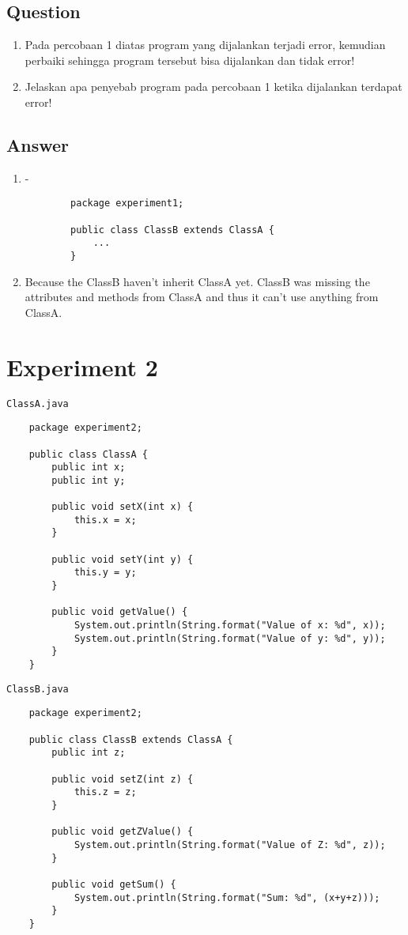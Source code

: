 \documentclass[12pt,titlepage]{article}
\begin{document}
\subsection{Question}
\begin{enumerate}
    \item Pada percobaan 1 diatas program yang dijalankan terjadi error, kemudian perbaiki sehingga program tersebut bisa dijalankan dan tidak error!
    \item Jelaskan apa penyebab program pada percobaan 1 ketika dijalankan terdapat error!
\end{enumerate}

\subsection{Answer}
\begin{enumerate}
    \item -
    \begin{verbatim}
        package experiment1;
    
        public class ClassB extends ClassA {
            ...
        }
    \end{verbatim}
    \item Because the ClassB haven't inherit ClassA yet. ClassB was missing the attributes and methods from ClassA and thus it can't use anything from ClassA.
\end{enumerate}

\newpage

\section{Experiment 2}
\texttt{ClassA.java}
\begin{verbatim}
    package experiment2;

    public class ClassA {
        public int x;
        public int y;

        public void setX(int x) {
            this.x = x;
        }

        public void setY(int y) {
            this.y = y;
        }

        public void getValue() {
            System.out.println(String.format("Value of x: %d", x));
            System.out.println(String.format("Value of y: %d", y));
        }
    }
\end{verbatim}
\texttt{ClassB.java}
\begin{verbatim}
    package experiment2;

    public class ClassB extends ClassA {
        public int z;

        public void setZ(int z) {
            this.z = z;
        }

        public void getZValue() {
            System.out.println(String.format("Value of Z: %d", z));
        }

        public void getSum() {
            System.out.println(String.format("Sum: %d", (x+y+z)));
        }
    }
\end{verbatim}
\end{document}

